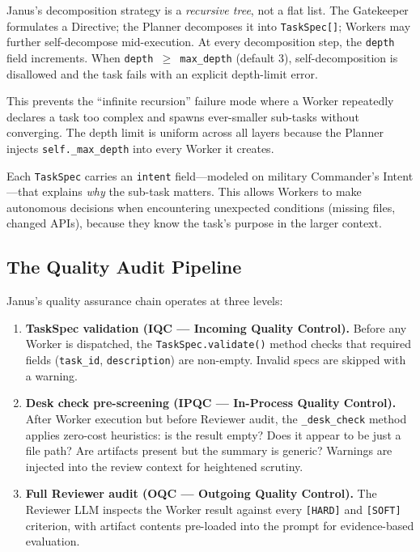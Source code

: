 \documentclass[11pt,a4paper]{article}
\begin{document}
Janus's decomposition strategy is a \emph{recursive tree}, not a flat list.
The Gatekeeper formulates a Directive; the Planner decomposes it into
\texttt{TaskSpec[]}; Workers may further self-decompose mid-execution.
At every decomposition step, the \texttt{depth} field increments. When
\texttt{depth $\geq$ max\_depth} (default 3), self-decomposition is
disallowed and the task fails with an explicit depth-limit error.

This prevents the ``infinite recursion'' failure mode where a Worker
repeatedly declares a task too complex and spawns ever-smaller sub-tasks
without converging. The depth limit is uniform across all layers because the
Planner injects \texttt{self.\_max\_depth} into every Worker it creates.

Each \texttt{TaskSpec} carries an \texttt{intent} field---modeled on military
Commander's Intent---that explains \emph{why} the sub-task matters. This
allows Workers to make autonomous decisions when encountering unexpected
conditions (missing files, changed APIs), because they know the task's purpose
in the larger context.

\subsection{The Quality Audit Pipeline}
\label{sec:quality-audit}

Janus's quality assurance chain operates at three levels:

\begin{enumerate}[leftmargin=*,itemsep=2pt]
    \item \textbf{TaskSpec validation (IQC --- Incoming Quality Control).}
    Before any Worker is dispatched, the \texttt{TaskSpec.validate()} method
    checks that required fields (\texttt{task\_id}, \texttt{description}) are
    non-empty. Invalid specs are skipped with a warning.

    \item \textbf{Desk check pre-screening (IPQC --- In-Process Quality Control).}
    After Worker execution but before Reviewer audit, the
    \texttt{\_desk\_check} method applies zero-cost heuristics: is the result
    empty? Does it appear to be just a file path? Are artifacts present but
    the summary is generic? Warnings are injected into the review context
    for heightened scrutiny.

    \item \textbf{Full Reviewer audit (OQC --- Outgoing Quality Control).}
    The Reviewer LLM inspects the Worker result against every
    \texttt{[HARD]} and \texttt{[SOFT]} criterion, with artifact contents
    pre-loaded into the prompt for evidence-based evaluation.
\end{enumerate}
\end{document}
